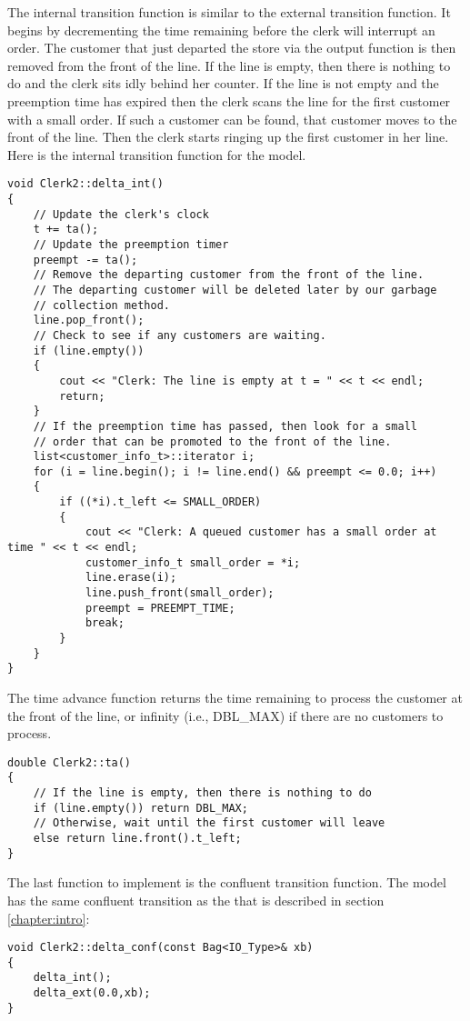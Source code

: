 The internal transition function is similar to the external transition function. It begins by decrementing the time remaining before the clerk will interrupt an order. The customer that just departed the store via the output function is then removed from the front of the line. If the line is empty, then there is nothing to do and the clerk sits idly behind her counter. If the line is not empty and the preemption time has expired then the clerk scans the line for the first customer with a small order. If such a customer can be found, that customer moves to the front of the line. Then the clerk starts ringing up the first customer in her line. Here is the internal transition function for the  model.
\begin{verbatim}
void Clerk2::delta_int()
{
    // Update the clerk's clock
    t += ta();
    // Update the preemption timer
    preempt -= ta();
    // Remove the departing customer from the front of the line.
    // The departing customer will be deleted later by our garbage
    // collection method.
    line.pop_front();
    // Check to see if any customers are waiting.
    if (line.empty())
    {
        cout << "Clerk: The line is empty at t = " << t << endl;
        return;
    }
    // If the preemption time has passed, then look for a small
    // order that can be promoted to the front of the line.
    list<customer_info_t>::iterator i;
    for (i = line.begin(); i != line.end() && preempt <= 0.0; i++)
    {
        if ((*i).t_left <= SMALL_ORDER)
        {
            cout << "Clerk: A queued customer has a small order at time " << t << endl;
            customer_info_t small_order = *i;
            line.erase(i);
            line.push_front(small_order);
            preempt = PREEMPT_TIME;
            break;
        }
    }
}
\end{verbatim}

The time advance function returns the time remaining to process the customer at the front of the line, or infinity (i.e., DBL\_MAX) if there are no customers to process.
\begin{verbatim}
double Clerk2::ta()
{
    // If the line is empty, then there is nothing to do
    if (line.empty()) return DBL_MAX;
    // Otherwise, wait until the first customer will leave
    else return line.front().t_left;
}
\end{verbatim}

The last function to implement is the confluent transition function. The  model has the same confluent transition as the  that is described in section \ref{chapter:intro}:
\begin{verbatim}
void Clerk2::delta_conf(const Bag<IO_Type>& xb)
{
    delta_int();
    delta_ext(0.0,xb);
}
\end{verbatim}

